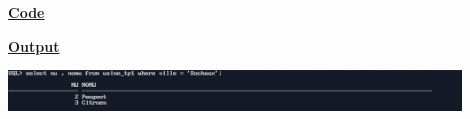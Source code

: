 \newpage
{}

\textbf{\underline{Code}}


\vspace{1cm}
\textbf{\underline{Output}}
\vspace{1cm}
\begin{center}
    \includegraphics[width=0.9\textwidth]{Questions/q9/q9.png}
\end{center}


